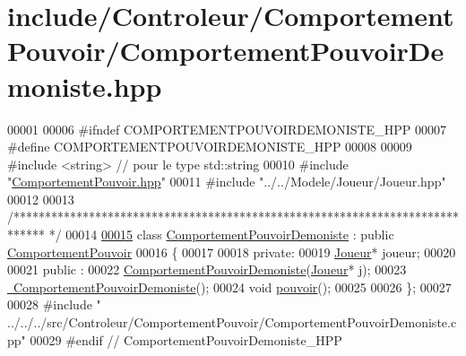 \hypertarget{_comportement_pouvoir_demoniste_8hpp_source}{\section{include/\-Controleur/\-Comportement\-Pouvoir/\-Comportement\-Pouvoir\-Demoniste.hpp}
}

\begin{DoxyCode}
00001 
00006 \textcolor{preprocessor}{#ifndef COMPORTEMENTPOUVOIRDEMONISTE\_HPP}
00007 \textcolor{preprocessor}{}\textcolor{preprocessor}{#define COMPORTEMENTPOUVOIRDEMONISTE\_HPP}
00008 \textcolor{preprocessor}{}
00009 \textcolor{preprocessor}{#include <string>} \textcolor{comment}{// pour le type std::string}
00010 \textcolor{preprocessor}{#include "\hyperlink{_comportement_pouvoir_8hpp}{ComportementPouvoir.hpp}"}
00011 \textcolor{preprocessor}{#include "../../Modele/Joueur/Joueur.hpp"}
00012 
00013 \textcolor{comment}{/*****************************************************************************
      */}
00014 
\hypertarget{_comportement_pouvoir_demoniste_8hpp_source_l00015}{}\hyperlink{class_comportement_pouvoir_demoniste}{00015} \textcolor{keyword}{class }\hyperlink{class_comportement_pouvoir_demoniste}{ComportementPouvoirDemoniste} : \textcolor{keyword}{public} \hyperlink{class_comportement_pouvoir}{ComportementPouvoir}
00016 \{
00017 
00018    \textcolor{keyword}{private}:
00019     \hyperlink{class_joueur}{Joueur}* joueur;
00020 
00021    \textcolor{keyword}{public} :
00022       \hyperlink{class_comportement_pouvoir_demoniste_a1f6b2e5586c6c0e48cd2d88be22e730a}{ComportementPouvoirDemoniste}(\hyperlink{class_joueur}{Joueur}* j);
00023       \hyperlink{class_comportement_pouvoir_demoniste_a95cd36e0a6e6b10c9931ca1f4b9daad8}{~ComportementPouvoirDemoniste}();
00024       \textcolor{keywordtype}{void} \hyperlink{class_comportement_pouvoir_demoniste_a85abc906021128b61ba1c292921c411d}{pouvoir}();
00025     
00026 \};
00027 
00028 \textcolor{preprocessor}{#include "
      ../../../src/Controleur/ComportementPouvoir/ComportementPouvoirDemoniste.cpp"}
00029 \textcolor{preprocessor}{#endif // ComportementPouvoirDemoniste\_HPP}
\end{DoxyCode}
